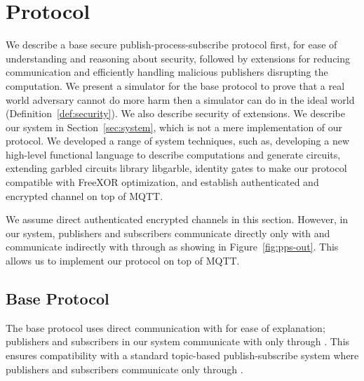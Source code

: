 \section{Protocol}
\label{sec:protocol}

We describe a base secure publish-process-subscribe protocol first, for ease of
understanding and reasoning about security, followed by extensions for reducing
communication and efficiently handling malicious publishers disrupting the
computation.  We present a simulator for the base protocol to prove that a real
world adversary cannot do more harm then a simulator can do in the ideal world
(Definition~\ref{def:security}). We also describe security of extensions. We
describe our system in Section~\ref{sec:system}, which is not a mere
implementation of our protocol. We developed a range of system techniques, such
as, developing a new high-level functional language to describe computations
and generate circuits, extending garbled circuits library libgarble, identity
gates to make our protocol compatible with FreeXOR optimization, and establish
authenticated and encrypted channel on top of MQTT. 

We assume direct authenticated encrypted channels in this section.  However, in
our system, publishers and subscribers communicate directly only with \broker
and communicate indirectly with \garbler through \broker as showing in
Figure~\ref{fig:pps-out}. This allows us to implement our protocol on top of
MQTT.

\subsection{Base Protocol}


The base protocol uses direct communication with \garbler for ease of
explanation; publishers and subscribers in our system communicate with \garbler
only through \broker. This ensures compatibility with a standard topic-based
publish-subscribe system where publishers and subscribers communicate only
through \broker.

